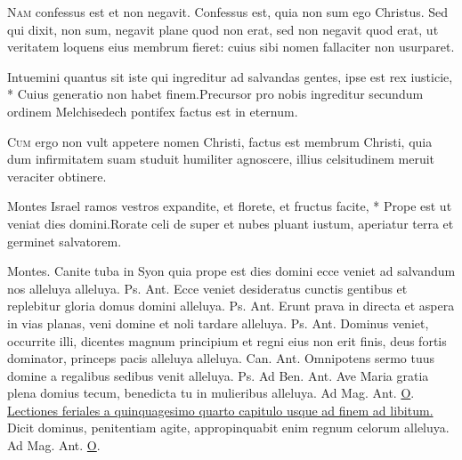 \begin{multicols*}{2}
\begin{responsory}
\end{responsory}
\lettrine[lines=2]{\zallmancaps \color{Red} N}{am} confessus est et non negavit. Confessus est, quia non sum ego Christus. Sed qui dixit, non sum, negavit plane quod non erat, sed non negavit quod erat, ut veritatem loquens eius membrum fieret: cuius sibi nomen fallaciter non usurparet.
\begin{responsory}
{Intuemini quantus sit iste qui ingreditur ad salvandas gentes, ipse est rex iusticie, * Cuius generatio non habet finem.}{Precursor pro nobis ingreditur secundum ordinem Melchisedech pontifex factus est in eternum.}
\end{responsory}
\lettrine[lines=2]{\zallmancaps \color{Blue} C}{um} ergo non vult appetere nomen Christi, factus est membrum Christi, quia dum infirmitatem suam studuit humiliter agnoscere, illius celsitudinem meruit veraciter obtinere.
\begin{responsory-doxology}
{Montes Israel ramos vestros expandite, et florete, et fructus facite, * Prope est ut veniat dies domini.}{Rorate celi de super et nubes pluant iustum, aperiatur terra et germinet salvatorem.}
\end{responsory-doxology}
Montes.
 Canite tuba in Syon quia prope est dies domini ecce veniet ad salvandum nos alleluya alleluya. {\color{Red} Ps.}  {\color{Red} Ant.} Ecce veniet desideratus cunctis gentibus et replebitur gloria domus domini alleluya. {\color{Red} Ps.}  {\color{Red} Ant.} Erunt prava in directa et aspera in vias planas, veni domine et noli tardare alleluya. {\color{Red} Ps.}  {\color{Red} Ant.} Dominus veniet, occurrite illi, dicentes magnum principium et regni eius non erit finis, deus fortis dominator, princeps pacis alleluya alleluya. {\color{Red} Can.}  {\color{Red} Ant.} Omnipotens sermo tuus domine a regalibus sedibus venit alleluya. {\color{Red} Ps.}  {\color{Red} Ad Ben. Ant.} Ave Maria gratia plena domius tecum, benedicta tu in mulieribus alleluya. {\color{Red} Ad Mag. Ant.} \hyperlink{o-antiphons}{O}.
\newline \ul{Lectiones feriales a quinquagesimo quarto capitulo usque ad finem ad libitum.}
 \hypertarget{ant-dicit-dominus}{Dicit} dominus, penitentiam agite, appropinquabit enim regnum celorum alleluya. {\color{Red} Ad Mag. Ant.} \hyperlink{o-antiphons}{O}.

\end{multicols*}
